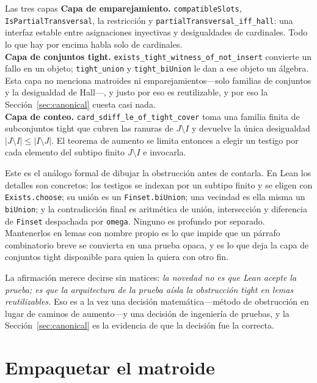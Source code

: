 \documentclass[11pt]{article}
\newcommand{\lean}[1]{\texttt{#1}}
\begin{document}
\begin{recipebox}{Las tres capas}
\textbf{Capa de emparejamiento.} \lean{compatibleSlots}, \lean{IsPartialTransversal}, la
restricción y \lean{partialTransversal\_iff\_hall}: una interfaz estable entre asignaciones
inyectivas y desigualdades de cardinales. Todo lo que hay por encima habla solo de
cardinales.\\[3pt]
\textbf{Capa de conjuntos tight.} \lean{exists\_tight\_witness\_of\_not\_insert} convierte un fallo
en un objeto; \lean{tight\_union} y \lean{tight\_biUnion} le dan a ese objeto un álgebra. Esta capa
no menciona matroides ni emparejamientos---solo familias de conjuntos y la desigualdad de Hall---, y
justo por eso es reutilizable, y por eso la Sección~\ref{sec:canonical} cuesta casi nada.\\[3pt]
\textbf{Capa de conteo.} \lean{card\_sdiff\_le\_of\_tight\_cover} toma una familia finita de
subconjuntos tight que cubren las ranuras de $J\setminus I$ y devuelve la única desigualdad
$|J\setminus I|\le|I\setminus J|$. El teorema de aumento se limita entonces a elegir un testigo por
cada elemento del subtipo finito $J\setminus I$ e invocarla.
\end{recipebox}

Este es el análogo formal de dibujar la obstrucción antes de contarla. En Lean los detalles son
concretos: los testigos se indexan por un subtipo finito y se eligen con \lean{Exists.choose}; su
unión es un \lean{Finset.biUnion}; una vecindad es ella misma un \lean{biUnion}; y la contradicción
final es aritmética de unión, intersección y diferencia de \lean{Finset} despachada por
\lean{omega}. Ninguno es profundo por separado. Mantenerlos en lemas con nombre propio es lo que
impide que un párrafo combinatorio breve se convierta en una prueba opaca, y es lo que deja la capa
de conjuntos tight disponible para quien la quiera con otro fin.

La afirmación merece decirse sin matices: \emph{la novedad no es que Lean acepte la prueba; es que
la arquitectura de la prueba aísla la obstrucción tight en lemas reutilizables.} Eso es a la vez
una decisión matemática---método de obstrucción en lugar de caminos de aumento---y una decisión de
ingeniería de pruebas, y la Sección~\ref{sec:canonical} es la evidencia de que la decisión fue la
correcta.

\section{Empaquetar el matroide}\label{sec:q4}
\end{document}
